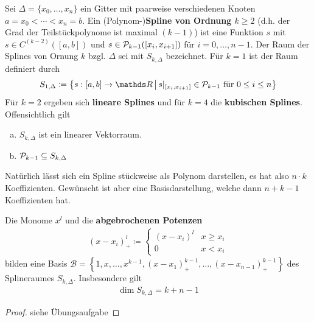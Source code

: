 \begin{Defe}
  Sei $\Delta =\{x_0,\dotsc,x_n\} $ ein Gitter
  mit paarweise verschiedenen Knoten $a=x_0<\dotsb<x_n=b$.
  Ein (Polynom-)\textbf{Spline von Ordnung $k$}$\geq 2$ 
  (d.h. der Grad der Teilstückpolynome ist maximal $(k-1)$)
  ist eine Funktion $s$ mit $s\in C^{(k-2)}([a,b])$
  und $s\in\mathcal{P}_{k-1}([x_i,x_{i+1}])$
  für $i=0,\dotsc,n-1$.
  Der Raum der Splines von Ornung $k$ bzgl. $\Delta$ sei
  mit $S_{k,\Delta}$ bezeichnet.
  Für $k=1$ ist der Raum definiert durch
  \begin{gather*}
    S_{1,\Delta} \coloneqq 
    \left\{
      s:[a,b]\rightarrow\R\,\middle\vert\,
      s|_{[x_i,x_{i+1}]}\in\p_{k-1}
      \text{ für } 0\leq i\leq n
    \right\}
  \end{gather*}
  Für $k=2$ ergeben sich \textbf{lineare Splines}
  und für $k=4$ die \textbf{kubischen Splines}.
  Offensichtlich gilt
  \begin{enumerate}[a)]
  \item $S_{k,\Delta}$ ist ein linearer Vektorraum.
  \item $\mathcal{P}_{k-1}\subseteq S_{k,\Delta}$
  \end{enumerate}
  Natürlich lässt sich ein Spline stückweise als Polynom darstellen,
  es hat also $n\cdot k$ Koeffizienten.
  Gewünscht ist aber eine Basisdarstellung,
  welche dann $n+k-1$ Koeffizienten hat.
\end{Defe}

\begin{Satze}\label{6.2.2}
  Die Monome $x^l$ und die \textbf{abgebrochenen Potenzen}
  \begin{gather}
    (x-x_i)_+^l\coloneqq
    \begin{cases}
      (x-x_i)^l & x\geq x_i\\
      0         & x<x_i
    \end{cases}
    \label{VI.2.1}
  \end{gather}
  bilden eine Basis
  $\mathcal{B}= \left\{
    1,x,\dotsc,x^{k-1},(x-x_1)_+^{k-1},\dotsc,(x-x_{n-1})_+^{k-1}
  \right\}$
  des Splineraumes $S_{k,\Delta}$. Insbesondere gilt
  \begin{gather}
    \dim S_{k,\Delta}=k+n-1
    \label{VI.2.2}
  \end{gather}

  \begin{proof}
    siehe Übungsaufgabe
  \end{proof}
\end{Satze}


